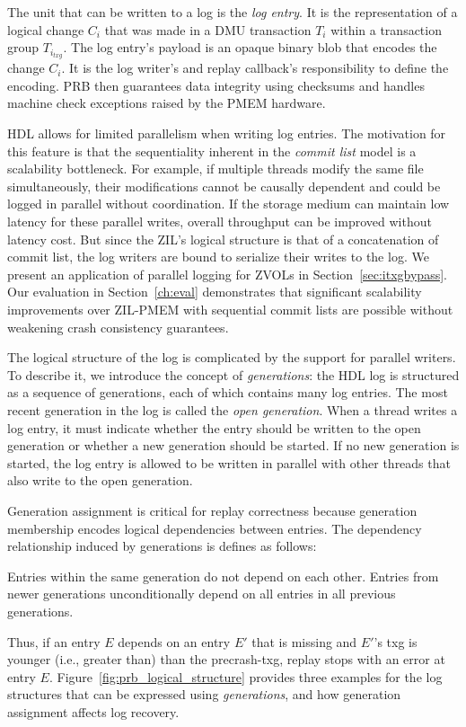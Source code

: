 \documentclass[12pt,a4paper,twoside]{book}
\begin{document}
The unit that can be written to a log is the \textit{log entry}.
It is the representation of a logical change $C_i$ that was made in a DMU transaction $T_i$ within a transaction group $T_{i_{txg}}$.
The log entry's payload is an opaque binary blob that encodes the change $C_i$.
It is the log writer's and replay callback's responsibility to define the encoding.
PRB then guarantees data integrity using checksums and handles machine check exceptions raised by the PMEM hardware.

HDL allows for limited parallelism when writing log entries.
The motivation for this feature is that the sequentiality inherent in the \textit{commit list} model is a scalability bottleneck.
For example, if multiple threads modify the same file simultaneously, their modifications cannot be causally dependent and could be logged in parallel without coordination.
If the storage medium can maintain low latency for these parallel writes, overall throughput can be improved without latency cost.
But since the ZIL's logical structure is that of a concatenation of commit list, the log writers are bound to serialize their writes to the log.
We present an application of parallel logging for ZVOLs in Section~\ref{sec:itxgbypass}.
Our evaluation in Section~\ref{ch:eval} demonstrates that significant scalability improvements over ZIL-PMEM with sequential commit lists are possible without weakening crash consistency guarantees.

The logical structure of the log is complicated by the support for parallel writers.
To describe it, we introduce the concept of \textit{generations}:
the HDL log is structured as a sequence of generations, each of which contains many log entries.
The most recent generation in the log is called the \textit{open generation}.
When a thread writes a log entry, it must indicate whether the entry should be written to the open generation or whether a new generation should be started.
If no new generation is started, the log entry is allowed to be written in parallel with other threads that also write to the open generation.

Generation assignment is critical for replay correctness because generation membership encodes logical dependencies between entries.
The dependency relationship induced by generations is defines as follows:
\begin{displayquote}
Entries within the same generation do not depend on each other.
Entries from newer generations unconditionally depend on all entries in all previous generations.
\end{displayquote}
Thus, if an entry $E$ depends on an entry $E'$ that is missing and $E'$'s txg is younger (i.e., greater than) than the precrash-txg, replay stops with an error at entry $E$.
Figure~\ref{fig:prb_logical_structure} provides three examples for the log structures that can be expressed using \textit{generations}, and how generation assignment affects log recovery.
\end{document}
